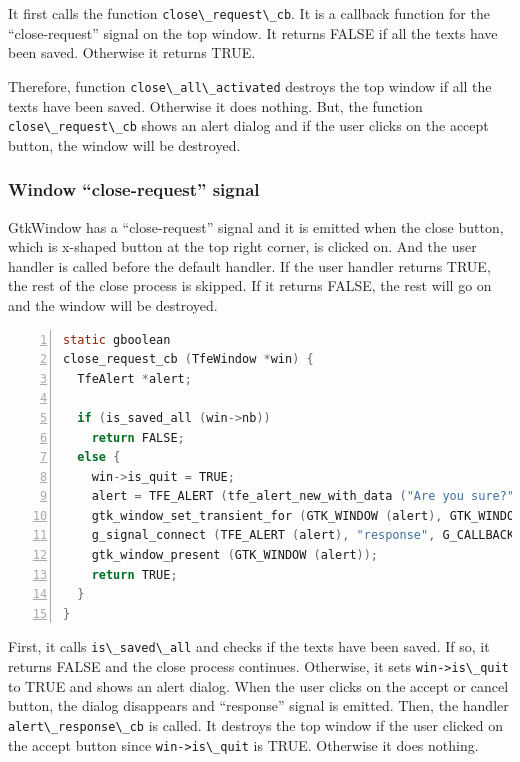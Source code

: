 It first calls the function
\passthrough{\lstinline!close\_request\_cb!}. It is a callback function
for the ``close-request'' signal on the top window. It returns FALSE if
all the texts have been saved. Otherwise it returns TRUE.

Therefore, function \passthrough{\lstinline!close\_all\_activated!}
destroys the top window if all the texts have been saved. Otherwise it
does nothing. But, the function
\passthrough{\lstinline!close\_request\_cb!} shows an alert dialog and
if the user clicks on the accept button, the window will be destroyed.

\subsubsection{Window ``close-request''
signal}\label{window-close-request-signal}

GtkWindow has a ``close-request'' signal and it is emitted when the
close button, which is x-shaped button at the top right corner, is
clicked on. And the user handler is called before the default handler.
If the user handler returns TRUE, the rest of the close process is
skipped. If it returns FALSE, the rest will go on and the window will be
destroyed.

\begin{lstlisting}[language=C, numbers=left]
static gboolean
close_request_cb (TfeWindow *win) {
  TfeAlert *alert;

  if (is_saved_all (win->nb))
    return FALSE;
  else {
    win->is_quit = TRUE;
    alert = TFE_ALERT (tfe_alert_new_with_data ("Are you sure?", "Contents aren't saved yet.\nAre you sure to quit?", "Quit"));
    gtk_window_set_transient_for (GTK_WINDOW (alert), GTK_WINDOW (win));
    g_signal_connect (TFE_ALERT (alert), "response", G_CALLBACK (alert_response_cb), win);
    gtk_window_present (GTK_WINDOW (alert));
    return TRUE;
  }
}
\end{lstlisting}

First, it calls \passthrough{\lstinline!is\_saved\_all!} and checks if
the texts have been saved. If so, it returns FALSE and the close process
continues. Otherwise, it sets \passthrough{\lstinline!win->is\_quit!} to
TRUE and shows an alert dialog. When the user clicks on the accept or
cancel button, the dialog disappears and ``response'' signal is emitted.
Then, the handler \passthrough{\lstinline!alert\_response\_cb!} is
called. It destroys the top window if the user clicked on the accept
button since \passthrough{\lstinline!win->is\_quit!} is TRUE. Otherwise
it does nothing.


